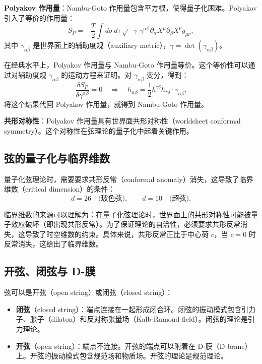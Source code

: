 \textbf{Polyakov 作用量}：Nambu-Goto 作用量包含平方根，使得量子化困难。Polyakov 引入了等价的作用量：
\begin{equation}
    S_P = -\frac{T}{2} \int d\sigma \, d\tau \, \sqrt{-\gamma} \, \gamma^{\alpha\beta} \partial_\alpha X^\mu \partial_\beta X^\nu g_{\mu\nu},
\end{equation}
其中 $\gamma_{\alpha\beta}$ 是世界面上的辅助度规（auxiliary metric），$\gamma = \det(\gamma_{\alpha\beta})$。

\begin{remark}
在经典水平上，Polyakov 作用量与 Nambu-Goto 作用量等价。这个等价性可以通过对辅助度规 $\gamma_{\alpha\beta}$ 的运动方程来证明。对 $\gamma_{\alpha\beta}$ 变分，得到：
\begin{equation}
    \frac{\delta S_P}{\delta \gamma^{\alpha\beta}} = 0 \quad \Rightarrow \quad h_{\alpha\beta} = \frac{1}{2} h^{\gamma\delta} h_{\gamma\delta} \cdot \gamma_{\alpha\beta}.
\end{equation}
将这个结果代回 Polyakov 作用量，就得到 Nambu-Goto 作用量。
\end{remark}

\textbf{共形对称性}：Polyakov 作用量具有世界面共形对称性（worldsheet conformal symmetry）。这个对称性在弦理论的量子化中起着关键作用。

\subsection{弦的量子化与临界维数}

量子化弦理论时，需要要求共形反常（conformal anomaly）消失，这导致了临界维数（critical dimension）的条件：
\begin{equation}
    d = 26 \quad \text{(玻色弦)}, \qquad d = 10 \quad \text{(超弦)}.
\end{equation}

\begin{remark}[临界维数的来源]
临界维数的来源可以理解为：在量子化弦理论时，世界面上的共形对称性可能被量子效应破坏（即出现共形反常）。为了保证理论的自洽性，必须要求共形反常消失，这导致了时空维数的约束。具体来说，共形反常正比于中心荷 $c$，当 $c = 0$ 时反常消失，这给出了临界维数。
\end{remark}

\subsection{开弦、闭弦与 D-膜}

弦可以是开弦（open string）或闭弦（closed string）：
\begin{itemize}
    \item \textbf{闭弦}（closed string）：端点连接在一起形成闭合环。闭弦的振动模式包含引力子、胀子（dilaton）和反对称张量场（Kalb-Ramond field）。闭弦的理论是引力理论。
    \item \textbf{开弦}（open string）：端点不连接。开弦的端点可以附着在 D-膜（D-brane）上。开弦的振动模式包含规范场和物质场。开弦的理论是规范理论。
\end{itemize}

